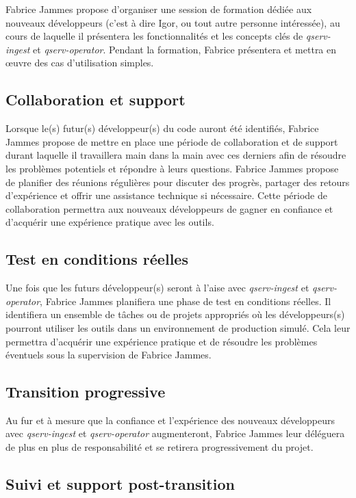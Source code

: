 \documentclass[french] {article}
\begin{document}
Fabrice Jammes propose d'organiser une session de formation dédiée aux nouveaux développeurs (c'est à dire Igor, ou tout autre personne intéressée), au cours de laquelle il présentera les fonctionnalités
et les concepts clés de \textit{qserv-ingest} et \textit{qserv-operator}. Pendant la formation, Fabrice présentera et mettra en œuvre des cas d'utilisation simples.

\subsection{Collaboration et support}

Lorsque le(s) futur(s) développeur(s) du code auront été identifiés, Fabrice Jammes propose de mettre en place une période de collaboration et de support durant laquelle il travaillera main dans la main
avec ces derniers afin de résoudre les problèmes potentiels et répondre à leurs questions. Fabrice Jammes propose de planifier des réunions régulières pour discuter des progrès, partager des retours
d'expérience et offrir une assistance technique si nécessaire. Cette période de collaboration permettra aux nouveaux développeurs de gagner en confiance et d'acquérir une expérience pratique avec les outils.

\subsection{Test en conditions réelles}

Une fois que les futurs développeur(s) seront à l'aise avec \textit{qserv-ingest} et \textit{qserv-operator}, Fabrice Jammes planifiera une phase de test en conditions réelles. Il identifiera un
ensemble de tâches ou de projets appropriés où les développeurs(s) pourront utiliser les outils dans un environnement de production simulé. Cela leur permettra d'acquérir une expérience pratique
et de résoudre les problèmes éventuels sous la supervision de Fabrice Jammes.

\subsection{Transition progressive}

Au fur et à mesure que la confiance et l'expérience des nouveaux développeurs avec \textit{qserv-ingest} et \textit{qserv-operator} augmenteront, Fabrice Jammes leur déléguera de plus en plus de
responsabilité et se retirera progressivement du projet.

\subsection{Suivi et support post-transition}
\end{document}
